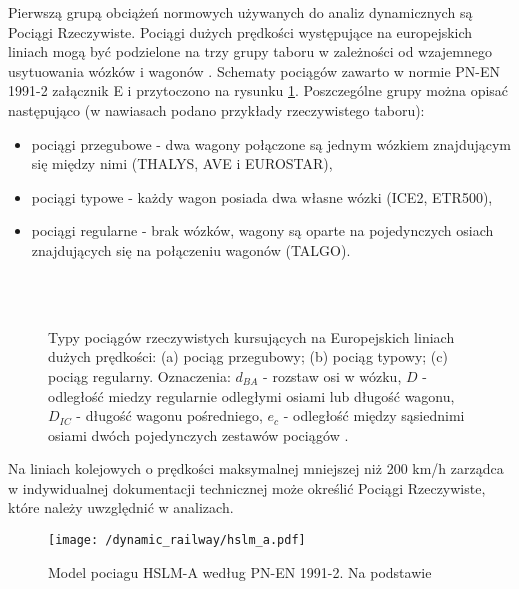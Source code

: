 Pierwszą grupą obciążeń normowych używanych do analiz dynamicznych są Pociągi Rzeczywiste. Pociągi dużych prędkości występujące na europejskich liniach mogą być podzielone na trzy grupy taboru w zależności od wzajemnego usytuowania wózków i wagonów \parencite{Goicolea2008a}. Schematy pociągów zawarto w normie PN-EN 1991-2 załącznik E i przytoczono na rysunku \ref{fig:train_types_EC}. Poszczególne grupy można opisać następująco (w nawiasach podano przykłady rzeczywistego taboru):
\begin{itemize} [noitemsep]
	\item pociągi przegubowe - dwa wagony połączone są jednym wózkiem znajdującym się między nimi (THALYS, AVE i EUROSTAR),
	\item pociągi typowe - każdy wagon posiada dwa własne wózki (ICE2, ETR500),
	\item pociągi regularne - brak wózków, wagony są oparte na pojedynczych osiach znajdujących się na połączeniu wagonów (TALGO).
\end{itemize}
\begin{figure}[h]
	\centering
	 \\
	 \\
	\captionsetup{justification=centering}
	\caption{Typy pociągów rzeczywistych kursujących na Europejskich liniach dużych prędkości: (a) pociąg przegubowy; (b) pociąg typowy; (c) pociąg regularny. Oznaczenia: $d_{BA}$ - rozstaw osi w wózku, $D$ - odległość miedzy regularnie odległymi osiami lub długość wagonu, $D_{IC}$ - długość wagonu pośredniego, $e_c$ - odległość między sąsiednimi osiami dwóch pojedynczych zestawów pociągów \parencite{PKNj}.}
	\label{fig:train_types_EC}
\end{figure}
Na liniach kolejowych o prędkości maksymalnej mniejszej niż 200 km/h zarządca w indywidualnej dokumentacji technicznej może określić Pociągi Rzeczywiste, które należy uwzględnić w analizach.

\begin{figure}[h]
	\centering
	\texttt{[image: /dynamic\_railway/hslm\_a.pdf]}
	\captionsetup{justification=centering}
	\caption{Model pociagu HSLM-A według PN-EN 1991-2. Na podstawie \cite{PKNj}}
	\label{fig:train_hslm_a}
\end{figure}

